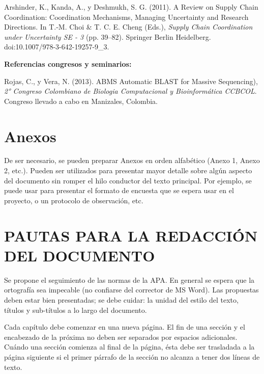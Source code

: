 \documentclass[12pt,letterpaper]{report}
\begin{document}
Arshinder, K., Kanda, A., y Deshmukh, S. G. (2011). A Review on Supply Chain Coordination: Coordination Mechanisms, Managing Uncertainty and Research Directions. In T.-M. Choi \& T. C. E. Cheng (Eds.), \textit{Supply Chain Coordination under Uncertainty SE - 3} (pp. 39–82). Springer Berlin Heidelberg. doi:10.1007/978-3-642-19257-9\_3.

\vspace{6pt}
\textbf{Referencias congresos y seminarios:}

Rojas, C., y Vera, N. (2013). ABMS Automatic BLAST for Massive Sequencing), \textit{2° Congreso Colombiano de Biologia Computacional y Bioinformática CCBCOL}. Congreso llevado a cabo en Manizales, Colombia.

\chapter{Anexos}

De ser necesario, se pueden preparar Anexos en orden alfabético (Anexo 1, Anexo 2, etc.). Pueden ser utilizados para presentar mayor detalle sobre algún aspecto del documento sin romper el hilo conductor del texto principal. Por ejemplo, se puede usar para presentar el formato de encuesta que se espera usar en el proyecto, o un protocolo de observación, etc.

\newpage
\chapter*{PAUTAS PARA LA REDACCIÓN DEL DOCUMENTO}

Se propone el seguimiento de las normas de la APA. En general se espera que la ortografía sea impecable (no confiarse del corrector de MS Word). Las propuestas deben estar bien presentadas; se debe cuidar: la unidad del estilo del texto, títulos y sub-títulos a lo largo del documento.

Cada capítulo debe comenzar en una nueva página. El fin de una sección y el encabezado de la próxima no deben ser separados por espacios adicionales. Cuándo una sección comienza al final de la página, ésta debe ser trasladada a la página siguiente si el primer párrafo de la sección no alcanza a tener dos líneas de texto.
\end{document}
